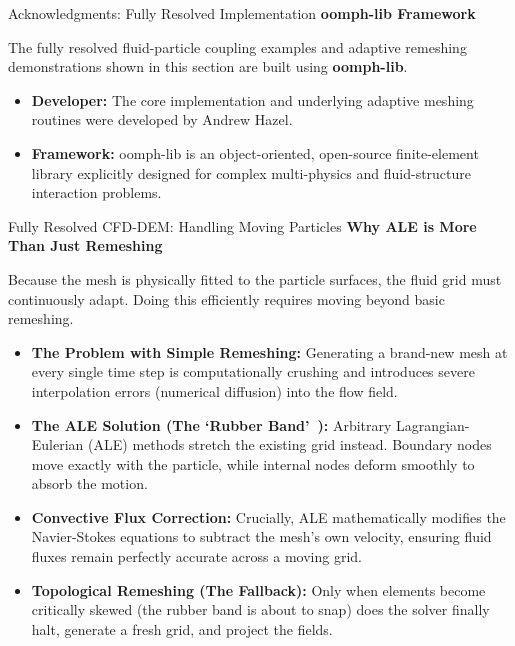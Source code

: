 \begin{frame}{Acknowledgments: Fully Resolved Implementation}
    \textbf{oomph-lib Framework}
    \vspace{0.3cm}
    
    The fully resolved fluid-particle coupling examples and adaptive remeshing demonstrations shown in this section are built using \textbf{oomph-lib}.
    
    \begin{itemize}
        \item \textbf{Developer:} The core implementation and underlying adaptive meshing routines were developed by Andrew Hazel.
        \item \textbf{Framework:} oomph-lib is an object-oriented, open-source finite-element library explicitly designed for complex multi-physics and fluid-structure interaction problems. %
        
      
    \end{itemize}
\end{frame}

\begin{frame}{Fully Resolved CFD-DEM: Handling Moving Particles}
    \textbf{Why ALE is More Than Just Remeshing}
    \vspace{0.3cm}
    
    Because the mesh is physically fitted to the particle surfaces, the fluid grid must continuously adapt. Doing this efficiently requires moving beyond basic remeshing.
    
    \begin{itemize}
        \item \textbf{The Problem with Simple Remeshing:} Generating a brand-new mesh at every single time step is computationally crushing and introduces severe interpolation errors (numerical diffusion) into the flow field.
        \item \textbf{The ALE Solution (The \lq Rubber Band\rq\ ):} Arbitrary Lagrangian-Eulerian (ALE) methods stretch the existing grid instead. Boundary nodes move exactly with the particle, while internal nodes deform smoothly to absorb the motion.
        \item \textbf{Convective Flux Correction:} Crucially, ALE mathematically modifies the Navier-Stokes equations to subtract the mesh's own velocity, ensuring fluid fluxes remain perfectly accurate across a moving grid.
        \item \textbf{Topological Remeshing (The Fallback):} Only when elements become critically skewed (the rubber band is about to snap) does the solver finally halt, generate a fresh grid, and project the fields.
    \end{itemize}
\end{frame}





